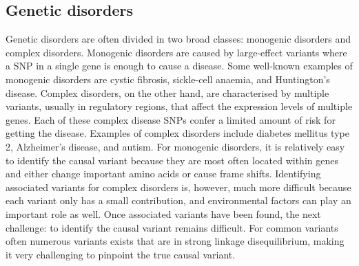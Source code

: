 \subsection{Genetic disorders}

Genetic disorders are often divided in two broad classes: monogenic disorders\cite{heidiRareGeneticDisorders2008} and complex disorders\cite{craigComplexDiseasesResearch2008}. Monogenic disorders are caused by large-effect variants where a SNP in a single gene is enough to cause a disease. Some well-known examples of monogenic disorders are cystic fibrosis\cite{keremIdentificationCysticFibrosis1989}, sickle-cell anaemia\cite{neelInheritanceSickleCell1949}, and Huntington's disease\cite{gusellaPolymorphicDNAMarker1983}. Complex disorders, on the other hand, are characterised by multiple variants, usually in regulatory regions, that affect the expression levels of multiple genes. Each of these complex disease SNPs confer a limited amount of risk for getting the disease. Examples of complex disorders include diabetes mellitus type 2\cite{americandiabetesassociationDiagnosisClassificationDiabetes2007}, Alzheimer's disease\cite{hardyAlzheimerDiseaseAmyloid1992}, and autism\cite{PolygenicTransmissionDisequilibrium}. For monogenic disorders, it is relatively easy to identify the causal variant because they are most often located within genes and either change important amino acids or cause frame shifts. Identifying associated variants for complex disorders is, however, much more difficult because each variant only has a small contribution, and environmental factors can play an important role as well. Once associated variants have been found, the next challenge: to identify the causal variant remains difficult. For common variants often numerous variants exists that are in strong linkage disequilibrium, making it very challenging to pinpoint the true causal variant.


